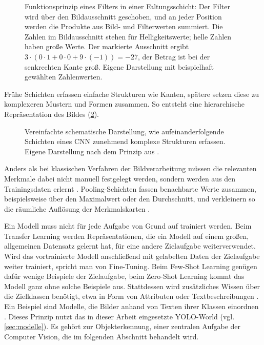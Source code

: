 \begin{figure}[H]
  \centering
  \resizebox{0.7\linewidth}{!}{}
  \caption[Faltung mit einem Filter]{Funktionsprinzip eines Filters in einer Faltungsschicht: Der Filter wird über den Bildausschnitt geschoben, und an jeder Position werden die Produkte aus Bild- und Filterwerten summiert. Die Zahlen im Bildausschnitt stehen für Helligkeitswerte; helle Zahlen haben große Werte. Der markierte Ausschnitt ergibt $3\cdot(0\cdot1+0\cdot0+9\cdot(-1))=-27$, der Betrag ist bei der senkrechten Kante groß. Eigene Darstellung mit beispielhaft gewählten Zahlenwerten.}
  \label{fig:faltung}
\end{figure}

\noindent Frühe Schichten erfassen einfache Strukturen wie Kanten, spätere setzen diese zu komplexeren Mustern und Formen zusammen. So entsteht eine hierarchische Repräsentation des Bildes (\cref{fig:cnn-hierarchie}). 

\begin{figure}[H]
  \centering
  \resizebox{\linewidth}{!}{}
  \caption[Merkmalshierarchie in einem CNN]{Vereinfachte schematische Darstellung, wie aufeinanderfolgende Schichten eines CNN zunehmend komplexe Strukturen erfassen. Eigene Darstellung nach dem Prinzip aus \cite{lecun2015deep,goodfellow2016deep}.}
  \label{fig:cnn-hierarchie}
\end{figure}

\noindent Anders als bei klassischen Verfahren der Bildverarbeitung müssen die relevanten Merkmale dabei nicht manuell festgelegt werden, sondern werden aus den Trainingsdaten erlernt \cite{lecun2015deep, goodfellow2016deep}. Pooling-Schichten fassen benachbarte Werte zusammen, beispielsweise über den Maximalwert oder den Durchschnitt, und verkleinern so die räumliche Auflösung der Merkmalskarten \cite{goodfellow2016deep}. 

Ein Modell muss nicht für jede Aufgabe von Grund auf trainiert werden. Beim Transfer Learning werden Repräsentationen, die ein Modell auf einem großen, allgemeinen Datensatz gelernt hat, für eine andere Zielaufgabe weiterverwendet. Wird das vortrainierte Modell anschließend mit gelabelten Daten der Zielaufgabe weiter trainiert, spricht man von Fine-Tuning. Beim Few-Shot Learning genügen dafür wenige Beispiele der Zielaufgabe, beim Zero-Shot Learning kommt das Modell ganz ohne solche Beispiele aus. Stattdessen wird zusätzliches Wissen über die Zielklassen benötigt, etwa in Form von Attributen oder Textbeschreibungen \cite{zhang2019recent}. Ein Beispiel sind Modelle, die Bilder anhand von Texten ihrer Klassen einordnen \cite{zhai2022lit}. Dieses Prinzip nutzt das in dieser Arbeit eingesetzte YOLO-World \cite{cheng2024yoloworld} (vgl. \cref{sec:modelle}). Es gehört zur Objekterkennung, einer zentralen Aufgabe der Computer Vision, die im folgenden Abschnitt behandelt wird. 

